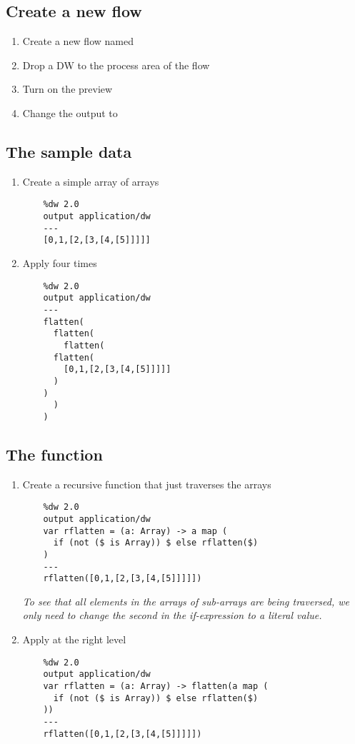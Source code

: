 \subsection{Create a new flow}
\begin{enumerate}
\item Create a new flow named 
\item Drop a DW to the process area of the flow
\item Turn on the preview
\item Change the output to 
\end{enumerate}

\subsection{The sample data}
\begin{enumerate}[resume*]
\item Create a simple array of arrays
  \begin{verbatim}
    %dw 2.0
    output application/dw
    ---
    [0,1,[2,[3,[4,[5]]]]]
  \end{verbatim}
\item Apply  four times
  \begin{verbatim}
    %dw 2.0
    output application/dw
    ---
    flatten(
      flatten(
        flatten(
	  flatten(
	    [0,1,[2,[3,[4,[5]]]]]
	  )
	)
      )
    )
  \end{verbatim}
\end{enumerate}

\subsection{The  function}
\begin{enumerate}[resume*]
\item Create a recursive function that just traverses the arrays
  \begin{verbatim}
    %dw 2.0
    output application/dw
    var rflatten = (a: Array) -> a map (
      if (not ($ is Array)) $ else rflatten($)
    )
    ---
    rflatten([0,1,[2,[3,[4,[5]]]]])
  \end{verbatim}
  \emph{
    To see that all elements in the arrays of sub-arrays are being traversed, we only need to change the second \ttt{\$} in the if-expression to a literal value.
  }
\item Apply  at the right level
  \begin{verbatim}
    %dw 2.0
    output application/dw
    var rflatten = (a: Array) -> flatten(a map (
      if (not ($ is Array)) $ else rflatten($)
    ))
    ---
    rflatten([0,1,[2,[3,[4,[5]]]]])
  \end{verbatim}
\end{enumerate}

